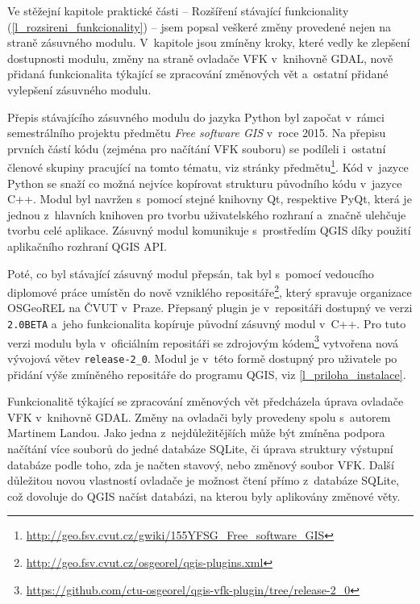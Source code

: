 \documentclass[a4paper,12pt,oneside]{book}
\begin{document}
Ve stěžejní kapitole praktické části -- Rozšíření stávající
funkcionality (\ref{l_rozsireni_funkcionality}) -- jsem popsal veškeré
změny provedené nejen na straně zásuvného modulu. V~kapitole jsou zmíněny kroky,
které vedly ke zlepšení dostupnosti modulu, změny na straně ovladače 
VFK v~knihovně GDAL, nově přidaná funkcionalita týkající se zpracování
změnových vět a~ostatní přidané vylepšení zásuvného modulu.

Přepis stávajícího zásuvného modulu do jazyka Python byl započat v~rámci
semestrálního projektu předmětu \textit{Free software GIS} v~roce 2015.
Na přepisu prvních částí kódu (zejména pro načítání VFK souboru) se podíleli
i~ostatní členové skupiny pracující na tomto tématu, viz stránky předmětu\footnote{\url{http://geo.fsv.cvut.cz/gwiki/155YFSG_Free_software_GIS}}.
Kód v~jazyce Python se snaží co možná nejvíce kopírovat strukturu původního kódu 
v~jazyce C++. Modul byl navržen s~pomocí stejné knihovny Qt, respektive PyQt, 
která je jednou z~hlavních knihoven pro tvorbu uživatelského rozhraní a~značně
ulehčuje tvorbu celé aplikace. Zásuvný modul komunikuje s~prostředím
QGIS díky použití aplikačního rozhraní QGIS API.

Poté, co byl stávající zásuvný modul přepsán, tak byl s~pomocí vedoucího 
diplo\-mové práce umístěn do nově vzniklého
repositáře\footnote{\label{l_qgis_repo}\url{http://geo.fsv.cvut.cz/osgeorel/qgis-plugins.xml}},
který spravuje organizace OSGeo\-REL na ČVUT v~Praze. Přepsaný plugin je v~repositáři
dostupný ve verzi \texttt{2.0BETA} a~jeho funkcionalita kopíruje
původní zásuvný modul v~C++. Pro tuto verzi modulu byla v~oficiálním
repositáři se zdrojovým
kódem\footnote{\url{https://github.com/ctu-osgeorel/qgis-vfk-plugin/tree/release-2_0}}
vytvořena nová vývojová větev \texttt{release-2\_0}. Modul je v~této
formě dostupný pro uživatele po přidání výše zmíněného repositáře do
programu QGIS, viz \ref{l_priloha_instalace}.

Funkcionalitě týkající se zpracování změnových vět předcházela úprava
ovladače VFK v~knihovně GDAL. Změny na ovladači byly provedeny spolu
s~autorem Martinem Landou. Jako jedna z~nejdůležitějších může být zmíněna 
podpora načítání více
souborů do jedné databáze SQLite, či úprava struktury výstupní
databáze podle toho, zda je načten stavový, nebo změnový soubor
VFK. Další důležitou novou vlastností ovladače je možnost čtení přímo
z~databáze SQLite, což dovoluje do QGIS načíst databázi, na kterou
byly aplikovány změnové věty.
\end{document}
